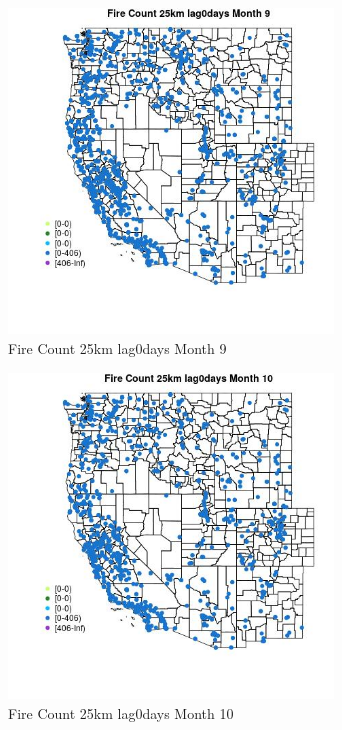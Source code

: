 \begin{figure} 
\centering  
\includegraphics[width=0.77\textwidth]{Code_Outputs/Report_ML_input_PM25_Step4_part_f_de_duplicated_aves_prioritize_24hr_obswNAs_MapObsMo9Fire_Count_25km_lag0days.jpg} 
\caption{\label{fig:Report_ML_input_PM25_Step4_part_f_de_duplicated_aves_prioritize_24hr_obswNAsMapObsMo9Fire_Count_25km_lag0days}Fire Count 25km lag0days Month 9} 
\end{figure} 
 

\begin{figure} 
\centering  
\includegraphics[width=0.77\textwidth]{Code_Outputs/Report_ML_input_PM25_Step4_part_f_de_duplicated_aves_prioritize_24hr_obswNAs_MapObsMo10Fire_Count_25km_lag0days.jpg} 
\caption{\label{fig:Report_ML_input_PM25_Step4_part_f_de_duplicated_aves_prioritize_24hr_obswNAsMapObsMo10Fire_Count_25km_lag0days}Fire Count 25km lag0days Month 10} 
\end{figure} 
 

